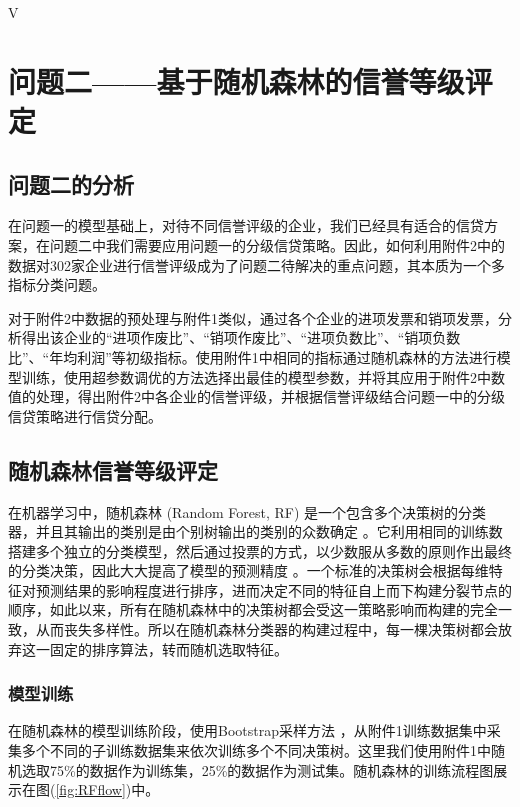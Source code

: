\documentclass[withoutpreface,bwprint]{cumcmthesis} %
\begin{document}
\begin{center}
	\textcircled{V}
\end{center}


\section{问题二——基于随机森林的信誉等级评定}
\subsection{问题二的分析}
在问题一的模型基础上，对待不同信誉评级的企业，我们已经具有适合的信贷方案，在问题二中我们需要应用问题一的分级信贷策略。因此，如何利用附件2中的数据对302家企业进行信誉评级成为了问题二待解决的重点问题，其本质为一个多指标分类问题。

对于附件2中数据的预处理与附件1类似，通过各个企业的进项发票和销项发票，分析得出该企业的“进项作废比”、“销项作废比”、“进项负数比”、“销项负数比”、“年均利润”等初级指标。使用附件1中相同的指标通过随机森林的方法进行模型训练，使用超参数调优的方法选择出最佳的模型参数，并将其应用于附件2中数值的处理，得出附件2中各企业的信誉评级，并根据信誉评级结合问题一中的分级信贷策略进行信贷分配。


\subsection{随机森林信誉等级评定}
在机器学习中，随机森林 (Random Forest, RF) 是一个包含多个决策树的分类器，并且其输出的类别是由个别树输出的类别的众数确定 \cite{姚登举2014基于随机森林的特征选择算法}。它利用相同的训练数搭建多个独立的分类模型，然后通过投票的方式，以少数服从多数的原则作出最终的分类决策，因此大大提高了模型的预测精度 \cite{李欣海2013随机森林模型在分类与回归分析中的应用}。一个标准的决策树会根据每维特征对预测结果的影响程度进行排序，进而决定不同的特征自上而下构建分裂节点的顺序，如此以来，所有在随机森林中的决策树都会受这一策略影响而构建的完全一致，从而丧失多样性。所以在随机森林分类器的构建过程中，每一棵决策树都会放弃这一固定的排序算法，转而随机选取特征。

\subsubsection{模型训练}
在随机森林的模型训练阶段，使用Bootstrap采样方法 \cite{刘建2006对, 高子林2017基于}，从附件1训练数据集中采集多个不同的子训练数据集来依次训练多个不同决策树。这里我们使用附件1中随机选取75\%的数据作为训练集，25\%的数据作为测试集。随机森林的训练流程图展示在图(\ref{fig:RFflow})中。
\end{document}

